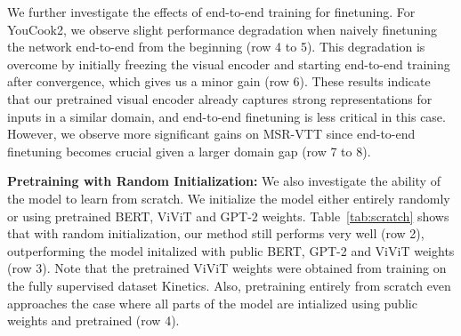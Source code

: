 \documentclass[10pt,twocolumn,letterpaper]{article}
\begin{document}
We further investigate the effects of end-to-end training for finetuning. 
For YouCook2, we observe slight performance degradation when naively finetuning the network end-to-end from the beginning (row 4 to 5).
This degradation is overcome by initially freezing the visual encoder and starting end-to-end training after convergence, which gives us a minor gain (row 6).
These results indicate that our pretrained visual encoder already captures strong representations for inputs in a similar domain, and end-to-end finetuning is less critical in this case.
However, we observe more significant gains on MSR-VTT since end-to-end finetuning becomes crucial given a larger domain gap (row 7 to 8).

\begin{table}[t]

\vspace{-0.1cm}
    \centering
    \caption{Ablations on YouCook2 showing the effect of initialization and pretraining. \textbf{Public Weights}: Initialization with public BERT, GPT-2 and ViViT weights.
} 
    \label{tab:scratch}
\end{table}

\noindent\textbf{Pretraining with Random Initialization:}
We also investigate the ability of the model to learn from scratch.
We initialize the model either entirely randomly or using pretrained BERT, ViViT and GPT-2 weights.
Table~\ref{tab:scratch} shows that with random initialization, our method still performs very well (row 2), outperforming the model initalized with public BERT, GPT-2 and ViViT weights (row 3). Note that the pretrained ViViT weights were obtained from training on the fully supervised dataset Kinetics. 
Also, pretraining entirely from scratch even approaches the case where all parts of the model are intialized using public weights and pretrained (row 4).
\end{document}
